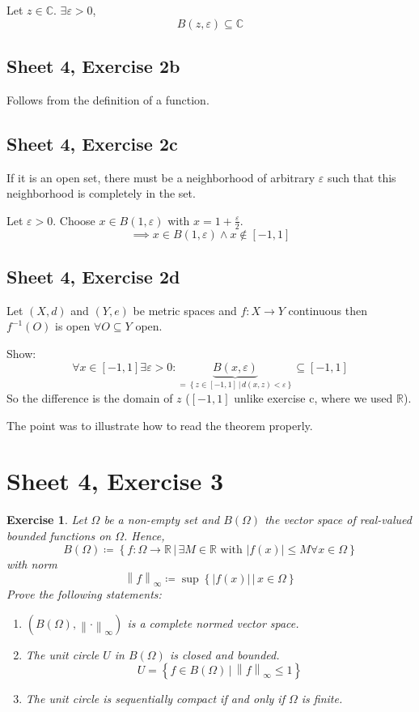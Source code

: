 \documentclass{article}
\newtheorem{ex}{Exercise} %
\newcommand{\setdef}[2]{\left\{\left.#1\,\right|\,#2\right\}}
\newcommand{\norm}[1]{\left\|#1\right\|}
\newcommand{\card}[1]{\left|#1\right|}
\begin{document}
Let $z \in \mathbb C$. $\exists \varepsilon > 0$,
\[ B(z, \varepsilon) \subseteq \mathbb C \]

\subsection{Sheet 4, Exercise 2b}
Follows from the definition of a function.

\subsection{Sheet 4, Exercise 2c}
If it is an open set, there must be a neighborhood of arbitrary $\varepsilon$
such that this neighborhood is completely in the set.

Let $\varepsilon > 0$. Choose $x \in B(1, \varepsilon)$ with $x = 1 + \frac{\varepsilon}2$.
\[ \implies x \in B(1, \varepsilon) \land x \not\in [-1,1] \]

\subsection{Sheet 4, Exercise 2d}
Let $(X,d)$ and $(Y,e)$ be metric spaces and $f: X \to Y$ continuous
then $f^{-1}(O)$ is open $\forall O \subseteq Y$ open.

Show:
\[ \forall x \in [-1,1] \exists \varepsilon > 0: \underbrace{B(x, \varepsilon)}_{= \setdef{z \in [-1,1]}{d(x, z) < \varepsilon}} \subseteq [-1,1] \]
So the difference is the domain of $z$ ($[-1,1]$ unlike exercise c, where we used $\mathbb R$).

The point was to illustrate how to read the theorem properly.

\section{Sheet 4, Exercise 3}
\begin{ex}
  Let $\Omega$ be a non-empty set and $B(\Omega)$ the vector space of real-valued bounded functions on $\Omega$.
  Hence,
  \[ B(\Omega) \coloneqq \setdef{f: \Omega \to \mathbb R}{\exists M \in \mathbb R \text{ with } \card{f(x)} \leq M \forall x \in \Omega} \]
  with norm
  \[ \norm{f}_{\infty} \coloneqq \sup\setdef{\card{f(x)}}{x \in \Omega} \]
  Prove the following statements:
  \begin{enumerate}
    \item $(B(\Omega), \norm{\cdot}_{\infty})$ is a complete normed vector space.
    \item The unit circle $U$ in $B(\Omega)$ is closed and bounded.
      \[ U = \setdef{f \in B(\Omega)}{\norm{f}_{\infty} \leq 1} \]
    \item The unit circle is sequentially compact if and only if $\Omega$ is finite.
  \end{enumerate}
\end{ex}
\end{document}
